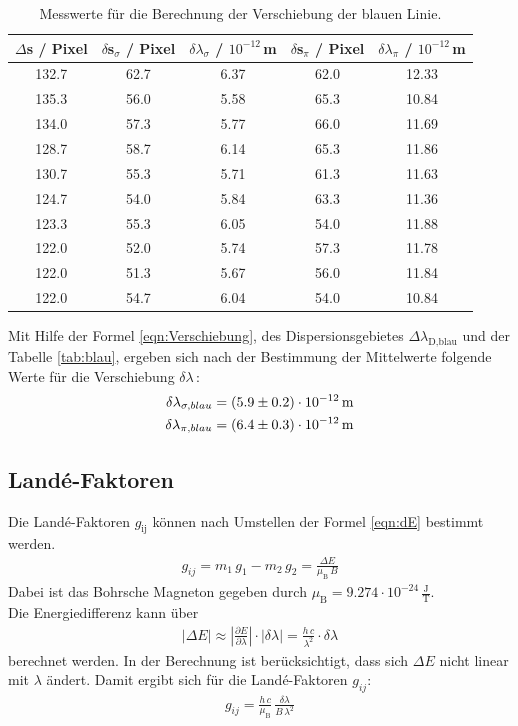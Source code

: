 \begin{table}[H]
  \centering
  \caption{Messwerte für die Berechnung der Verschiebung der blauen Linie.}
  \label{tab:blau}
  \begin{tabular}{c | c c | c c}
    $\Delta$s / Pixel & $\delta$s$_{\sigma}$ / Pixel & $\delta \lambda_{\sigma}$ / $10^{-12}$\,m & $\delta$s$_{\pi}$ / Pixel & $\delta \lambda_{\pi}$ / $10^{-12}$\,m \\
    \hline
    132.7 & 62.7 & 6.37 & 62.0 & 12.33 \\
    135.3 & 56.0 & 5.58 & 65.3 & 10.84 \\
    134.0 & 57.3 & 5.77 & 66.0 & 11.69 \\
    128.7 & 58.7 & 6.14 & 65.3 & 11.86 \\
    130.7 & 55.3 & 5.71 & 61.3 & 11.63 \\
    124.7 & 54.0 & 5.84 & 63.3 & 11.36 \\
    123.3 & 55.3 & 6.05 & 54.0 & 11.88 \\
    122.0 & 52.0 & 5.74 & 57.3 & 11.78 \\
    122.0 & 51.3 & 5.67 & 56.0 & 11.84 \\
    122.0 & 54.7 & 6.04 & 54.0 & 10.84 \\
    \hline
  \end{tabular}
\end{table}

Mit Hilfe der Formel \eqref{eqn:Verschiebung}, des Dispersionsgebietes $\Delta\lambda_\text{D,blau}$ und der Tabelle \eqref{tab:blau}, ergeben sich nach der Bestimmung der Mittelwerte folgende Werte für die Verschiebung $\delta\lambda$\,:
\begin{align*}
  \delta \lambda_{\sigma,blau} = (\num{5.9 +- 0.2})\cdot 10^{-12}\,\text{m} \\
  \delta \lambda_{\pi,blau} = (\num{6.4 +- 0.3})\cdot 10^{-12}\,\text{m}
\end{align*}



\subsection{Landé-Faktoren}
Die Landé-Faktoren $g_\text{ij}$ können nach Umstellen der Formel \eqref{eqn:dE} bestimmt werden.
\begin{align}
  g_{ij} = m_1\,g_1 - m_2\,g_2 = \frac{\Delta E}{\mu_\text{B}\,B}
\end{align}
Dabei ist das Bohrsche Magneton gegeben durch $\mu_\text{B} = 9.274 \cdot 10^{-24}\,\frac{\text{J}}{\text{T}}$.\\
Die Energiedifferenz kann über
\begin{align}
  |\Delta E| \approx \left| \frac{\partial E}{\partial \lambda}\right| \cdot |\delta\lambda| = \frac{h\,c}{\lambda^2}\cdot \delta\lambda
\end{align}
berechnet werden. In der Berechnung ist berücksichtigt, dass sich $\Delta E$ nicht linear mit $\lambda$ ändert. Damit ergibt sich für die Landé-Faktoren $g_{ij}$:
\begin{align}
  g_{ij} = \frac{h\,c}{\mu_\text{B}}\,\frac{\delta\lambda}{B\,\lambda^2}
  \label{eqn:Landé}
\end{align}




